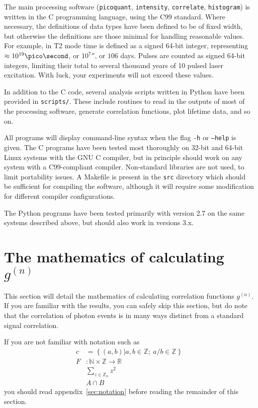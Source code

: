 \documentclass{article}
\newcommand{\braces}[1]{\ensuremath{\left\lbrace #1 \right\rbrace}}
\newcommand{\picoquant}{\texttt{picoquant}}
\newcommand{\intensity}{\texttt{intensity}}
\newcommand{\correlate}{\texttt{correlate}}
\newcommand{\histogram}{\texttt{histogram}}
\newcommand{\gn}[1]{\ensuremath{g^{(#1)}}}
\newcommand{\integers}{\ensuremath{\mathbb{Z}}}
\newcommand{\wholes}{\ensuremath{\mathbb{N}}}
\newcommand{\reals}{\ensuremath{\mathbb{R}}}
\begin{document}
The main processing software (\picoquant, \intensity, \correlate, \histogram) is written in the C programming language, using the C99 standard. Where necessary, the definitions of data types have been defined to be of fixed width, but otherwise the definitions are those minimal for handling reasonable values. For example, in T2 mode time is defined as a signed 64-bit integer, representing $\approx 10^{19}\pico\second$, or $10^{7}\second$, or $106$ days. Pulses are counted as signed 64-bit integers, limiting their total to several thousand years of 10\mega\hertz{} pulsed laser excitation. With luck, your experiments will not exceed these values. 

In addition to the C code, several analysis scripts written in Python have been provided in \texttt{scripts/}. These include routines to read in the outputs of most of the processing software, generate correlation functions, plot lifetime data, and so on. 

All programs will display command-line syntax when the flag \texttt{-h} or \texttt{--help} is given. The C programs have been tested most thoroughly on 32-bit and 64-bit Linux systems with the GNU C compiler, but in principle should work on any system with a C99-compliant compiler. Non-standard libraries are not used, to limit portability issues. A Makefile is present in the \texttt{src} directory which should be sufficient for compiling the software, although it will require some modification for different compiler configurations.

The Python programs have been tested primarily with version 2.7 on the same systems described above, but should also work in versions 3.x.

\section{The mathematics of calculating \gn{n}}
\label{sec:math_background}
This section will detail the mathematics of calculating correlation functions \gn{n}. If you are familiar with the results, you can safely skip this section, but do note that the correlation of photon events is in many ways distinct from a standard signal correlation.

If you are not familiar with notation such as
\begin{align}
c &= \braces{(a,b)|a,b\in\integers;~a/b\in\integers} \\
F&:\wholes\times\integers\rightarrow\reals \\
&\sum_{z\in\integers_{n}}{z^{2}} \\
&A\cap B
\end{align}
you should read appendix~\ref{sec:notation} before reading the remainder of this section.
\end{document}
